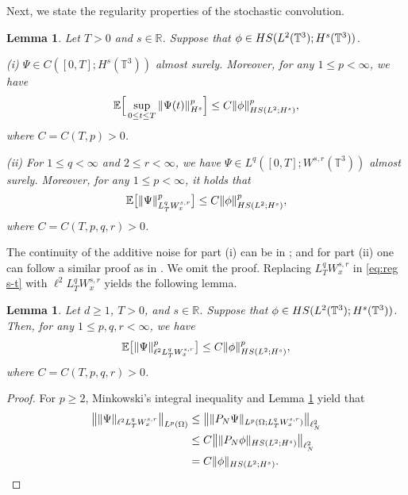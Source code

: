 \documentclass[letterpaper, 11pt,  reqno]{amsart}
\newtheorem{lemma}[theorem]{Lemma}
\newcommand{\1}{\hspace{0.5mm}\text{I}\hspace{0.5mm}}
\newcommand{\noi}{\noindent}
\newcommand{\R}{\mathbb{R}}
\newcommand{\T}{\mathbb{T}}
\newcommand{\HS}{\textup{HS}}
\renewcommand{\l}{\ell}
\renewcommand{\O}{\Omega}
\numberwithin{equation}{section}
\numberwithin{theorem}{section}
\begin{document}
Next, we state the regularity properties of the stochastic
convolution.



\begin{lemma}\label{Lem:sconv}
Let $T>0$ and $s \in \R$.
Suppose that 
$\phi\in \HS(L^2(\mathbb{T}^3); H^s(\T^3))$.


\noi
\textup{(i)} 
$\Psi\in C([0,T];H^s(\T^3))$ almost surely. 
Moreover, for any $1\leq p<\infty$, we have
\[
    \mathbb{E}
    \Big[\sup_{0\leq t\leq T}\|\Psi (t) \|^p_{H^s}\Big]
    \leq
    C\|\phi\|_{\HS(L^2;H^s)}^p,
\]
where $C=C(T,p)>0$.



\noi
\textup{(ii)}
For $1\leq q<\infty$ and $2\leq r<\infty$,
we have
$\Psi\in L^q([0,T];W^{s,r}(\T^3))$ almost surely.
Moreover,
for any $1\leq p<\infty$, it holds that
\begin{align}\label{eq:reg s-t}
    \mathbb{E}
    \big[
    \|\Psi\|_{L^q_T W_x^{s,r}}^p
    \big]
    \leq
    C\|\phi\|^p_{\HS(L^2;H^s)},
\end{align}
where $C=C(T,p,q,r)>0$.

\end{lemma}

The continuity of the additive noise for part \textup{(i)} 
can be  in \cite[Lemma 3.4]{CM18}; 
and for 
part \textup{(ii)} one can follow a similar proof as in
\cite[Lemma 2.8]{BLL24}. We omit the proof.
Replacing $L_T^q W_x^{s,r}$ in \eqref{eq:reg s-t} with $\l^2 L_T^q W_x^{s,r}$ yields the following lemma.

\begin{lemma}\label{Lem:sconv1}
Let $d\geq 1$, $T>0$, and $s \in \R$.
Suppose that $\phi\in \HS(L^2(\mathbb{T}^3); H^s(\T^3))$.
Then,
for any $1\leq p,q,r<\infty$, we have
\[
    \mathbb{E}
    \big[
   \| \Psi\|_{\l^2 L^q_T W_x^{s,r}}^p
    \big]
\leq
    C\|\phi\|^p_{\HS(L^2;H^s)},
\]
where $C=C(T,p,q,r)>0$.
\end{lemma}


\begin{proof}
For $p \ge 2$,
Minkowski's integral inequality
and
Lemma \ref{Lem:sconv}
yield that
\begin{align*}
\big\| \| \Psi\|_{\l^2 L^q_T W_x^{s,r}} \big\|_{L^p(\O)}
&\le
\big\| \| P_N \Psi \|_{L^p(\O; L^q_T W_x^{s,r})} \big\|_{\l^2_N}
\\
&\le
C
\big\| \| P_N \phi \|_{\HS(L^2; H^s)} \big\|_{\l^2_N}
\\
&=
C
\|\phi\|_{\HS(L^2;H^s)}.
\end{align*}
\end{proof}
\end{document}
